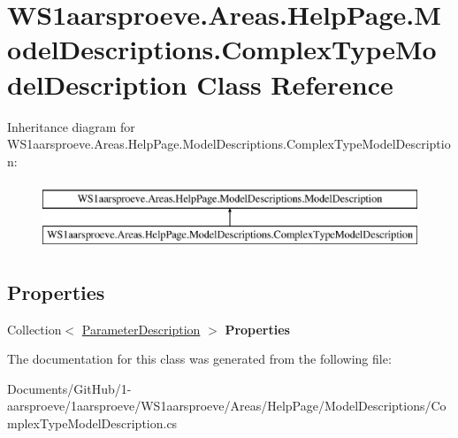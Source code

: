 \hypertarget{class_w_s1aarsproeve_1_1_areas_1_1_help_page_1_1_model_descriptions_1_1_complex_type_model_description}{}\section{W\+S1aarsproeve.\+Areas.\+Help\+Page.\+Model\+Descriptions.\+Complex\+Type\+Model\+Description Class Reference}
\label{class_w_s1aarsproeve_1_1_areas_1_1_help_page_1_1_model_descriptions_1_1_complex_type_model_description}
Inheritance diagram for W\+S1aarsproeve.\+Areas.\+Help\+Page.\+Model\+Descriptions.\+Complex\+Type\+Model\+Description\+:\begin{figure}[H]
\begin{center}
\leavevmode
\includegraphics[height=2.000000cm]{class_w_s1aarsproeve_1_1_areas_1_1_help_page_1_1_model_descriptions_1_1_complex_type_model_description}
\end{center}
\end{figure}
\subsection*{Properties}
\begin{DoxyCompactItemize}
\item 
\hypertarget{class_w_s1aarsproeve_1_1_areas_1_1_help_page_1_1_model_descriptions_1_1_complex_type_model_description_a2ce892eed85c4d483831d0eba9557a0b}{}Collection$<$ \hyperlink{class_w_s1aarsproeve_1_1_areas_1_1_help_page_1_1_model_descriptions_1_1_parameter_description}{Parameter\+Description} $>$ {\bfseries Properties}\label{class_w_s1aarsproeve_1_1_areas_1_1_help_page_1_1_model_descriptions_1_1_complex_type_model_description_a2ce892eed85c4d483831d0eba9557a0b}

\end{DoxyCompactItemize}


The documentation for this class was generated from the following file\+:\begin{DoxyCompactItemize}
\item 
Documents/\+Git\+Hub/1-\/aarsproeve/1aarsproeve/\+W\+S1aarsproeve/\+Areas/\+Help\+Page/\+Model\+Descriptions/Complex\+Type\+Model\+Description.\+cs\end{DoxyCompactItemize}
